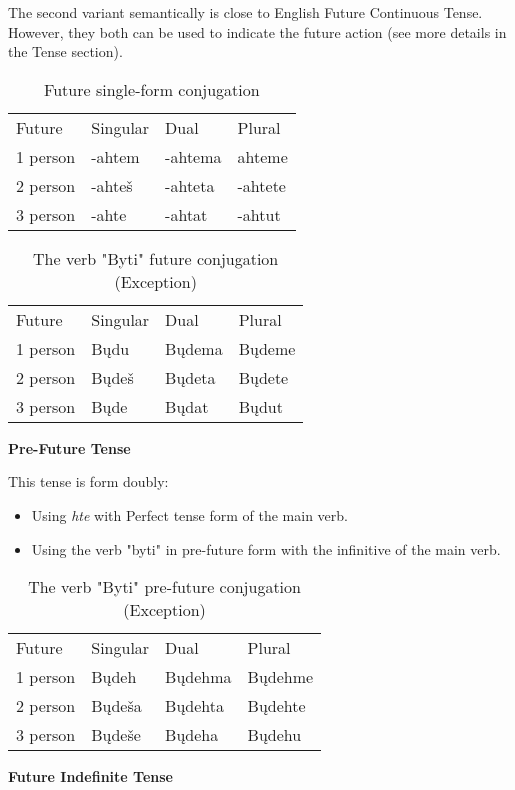 The second variant semantically is close to English Future Continuous Tense. However, they both can be used to indicate the future action (see more details in the Tense section).

\begin{table}[!htb]
	\caption{Future single-form conjugation}
	\begin{tabular}{llll}
		Future
		& Singular
		& Dual
		& Plural \\
		1 person & -ahtem & -ahtema & ahteme \\
		2 person & -ahteš & -ahteta & -ahtete \\
		3 person & -ahte & -ahtat & -ahtut
	\end{tabular}
\end{table}

\begin{table}[!htb]
	\caption{The verb "Byti" future conjugation (Exception)}
	\begin{tabular}{llll}
		Future
		& Singular
		& Dual
		& Plural \\
		1 person & Bųdu & Bųdema & Bųdeme \\
		2 person & Bųdeš & Bųdeta & Bųdete \\
		3 person & Bųde & Bųdat & Bųdut
	\end{tabular}
\end{table}

\textbf{Pre-Future Tense}

This tense is form doubly: 

\begin{itemize}
	\item Using \textit{hte} with Perfect tense form of the main verb.
	\item Using the verb "byti" in pre-future form with the infinitive of the main verb.
\end{itemize}

\begin{table}[!htb]
	\caption{The verb "Byti" pre-future conjugation (Exception)}
	\begin{tabular}{llll}
		Future
		& Singular
		& Dual
		& Plural \\
		1 person & Bųdeh & Bųdehma & Bųdehme \\
		2 person & Bųdeša & Bųdehta & Bųdehte \\
		3 person & Bųdeše & Bųdeha & Bųdehu
	\end{tabular}
\end{table}

\textbf{Future Indefinite Tense}

